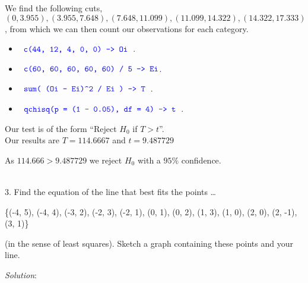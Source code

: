 \documentclass[12pt]{article}
\newcommand{\XB}{\color{black}}
\newcommand{\XBB}{\color{blue}}
\newcommand{\ds}{\displaystyle}
\begin{document}
We find the following cuts, $ (0, 3.955), (3.955, 7.648), (7.648, 11.099), (11.099, 14.322), (14.322,17.333) $, 
from which we can then count our observations for each category. \\

\begin{itemize}
    \item $ \ds {\XBB \texttt{ c(44, 12, 4, 0, 0) -> Oi }} $.
    \item $ \ds {\XBB \texttt{ c(60, 60, 60, 60, 60) / 5 -> Ei}} $.
    \item $ \ds {\XBB \texttt{ sum( (Oi - Ei)} \verb|^| \texttt{2 / Ei ) -> T }} $.
    \item $ \ds {\XBB \texttt{ qchisq(p = (1 - 0.05), df = 4) -> t }} $. \\
\end{itemize}

\noindent
Our test is of the form ``Reject $ H_{0} $ if $ T > t $''. \\

Our results are $ T = 114.6667 $ and $ t = 9.487729 $

As $ 114.666 > 9.487729 $ we reject $ H_{0} $ with a $ 95\% $ confidence. 

\vspace{2.5mm}

\newpage
\XBB\hrulefill\XB \\

3. Find the equation of the line that best fits the points \dots \\

\begin{center}
    \{(-4, 5), (-4, 4), (-3, 2), (-2, 3), (-2, 1), (0, 1), (0, 2), (1, 3), (1, 0), (2, 0), (2, -1), (3, 1)\}
\end{center}

(in the sense of least squares). Sketch a graph containing these points and your line. \\

\XBB\hrulefill\XB 
\vspace{5mm} 

\vspace{2.5mm} 
\textit{Solution}:
\vspace{2.5mm} \\ 
\end{document}
